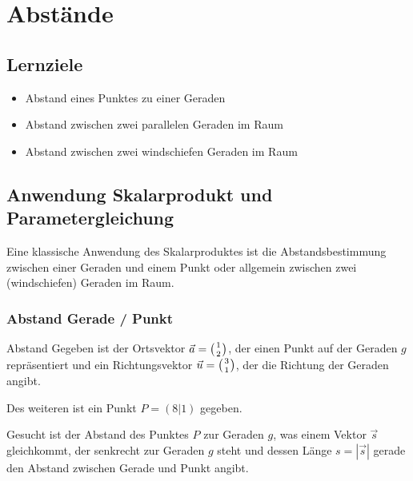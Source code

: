 \section{Abstände}

\subsection*{Lernziele}
\begin{itemize}
\item Abstand eines Punktes zu einer Geraden
\item Abstand zwischen zwei parallelen Geraden im Raum
\item Abstand zwischen zwei windschiefen Geraden im Raum
\end{itemize}

\newpage

\subsection{Anwendung Skalarprodukt und Parametergleichung}

Eine klassische Anwendung des Skalarproduktes ist die
Abstandsbestimmung zwischen einer Geraden und einem Punkt oder
allgemein zwischen zwei (windschiefen) Geraden im Raum.
\newpage

\subsubsection{Abstand Gerade / Punkt}

\begin{beispiel}{Abstand}{}
Gegeben ist der Ortsvektor $\vec{a}=\left(1 \atop 2\right)$, der einen Punkt auf der
Geraden $g$ repräsentiert und ein Richtungsvektor
$\vec{u}=\left(3\atop 1\right)$, der
die Richtung der Geraden angibt.

Des weiteren ist ein Punkt $P=(8|1)$ gegeben.

Gesucht ist der Abstand des Punktes $P$ zur Geraden $g$, was einem Vektor
$\vec{s}$ gleichkommt, der senkrecht zur Geraden $g$ steht und dessen Länge
$s=|\vec{s}|$ gerade den Abstand zwischen Gerade und Punkt angibt.
\end{beispiel}


